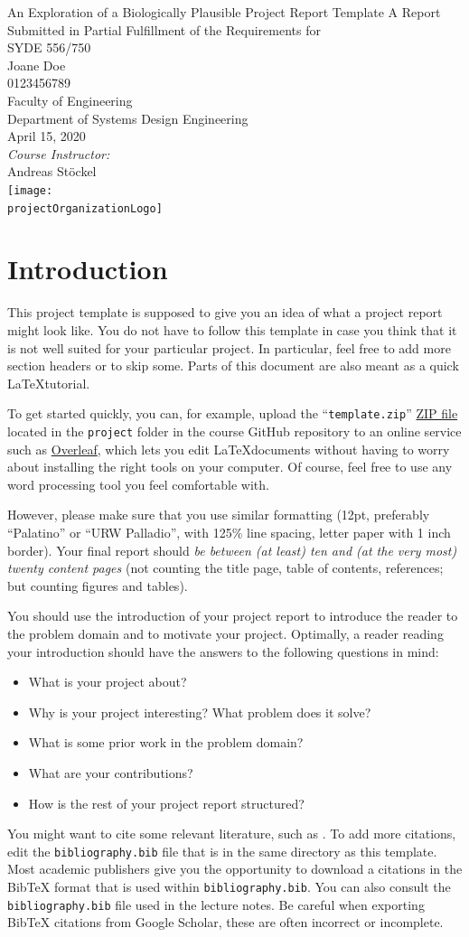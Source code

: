 \documentclass[12pt,letterpaper,oneside]{article}
\newcommand{\MakeTitle}{%
	{%
		\thispagestyle{empty}
		\centering
		{\huge \projectName}
		\vfill
		{\large A Report Submitted in Partial Fulfillment of the Requirements for\\ \projectCourse}\\[1cm]
		{\large \projectStudentName}\\
		{\projectStudentID} \\[1cm]
		{\large \projectStudentFaculty}\\
		{\large \projectStudentDepartment}\\
		\vfill
		{\large \projectDate}\\[1cm]
		\emph{Course Instructor:}\\
		\projectCourseInstructor\\
		\vfill
		\texttt{[image: \\projectOrganizationLogo]}
		\setcounter{page}{0}
		\newpage%
	}%
	{%
		\pagenumbering{roman}
		\setcounter{tocdepth}{2}
		\tableofcontents
		\newpage
		
		\setcounter{page}{0}
		\pagenumbering{arabic}
	}
}
\newcommand{\projectCourse}%
	{SYDE 556/750}
\newcommand{\projectCourseInstructor}%
	{Andreas Stöckel}
\newcommand{\projectOrganizationLogo}%
	{assets/uwlogo.pdf}
\newcommand{\projectName}%
	{An Exploration of a Biologically Plausible Project Report Template}
\newcommand{\projectStudentName}%
	{Joane Doe}
\newcommand{\projectStudentID}%
	{0123456789}
\newcommand{\projectStudentFaculty}%
	{Faculty of Engineering}
\newcommand{\projectStudentDepartment}%
	{Department of Systems Design Engineering}
\newcommand{\projectDate}%
	{April 15, 2020}
\begin{document}
	\MakeTitle

	\section{Introduction}
	\label{sec:introduction}

	This project template is supposed to give you an idea of what a project report might look like. You do not have to follow this template in case you think that it is not well suited for your particular project. In particular, feel free to add more section headers or to skip some. Parts of this document are also meant as a quick \LaTeX tutorial.

	To get started quickly, you can, for example, upload the \enquote{\texttt{template.zip}} \href{https://github.com/astoeckel/syde556-w20/raw/master/project/template.zip}{ZIP file} located in the \texttt{project} folder in the course GitHub repository to an online service such as \href{https://www.overleaf.com/}{Overleaf}, which lets you edit \LaTeX documents without having to worry about installing the right tools on your computer. Of course, feel free to use any word processing tool you feel comfortable with.

	However, please make sure that you use similar formatting (12pt, preferably \enquote{Palatino} or \enquote{URW Palladio}, with 125\% line spacing, letter paper with 1 inch border). Your final report should \emph{be between (at least) ten and (at the very most) twenty content pages} (not counting the title page, table of contents, references; but counting figures and tables).

	You should use the introduction of your project report to introduce the reader to the problem domain and to motivate your project. Optimally, a reader reading your introduction should have the answers to the following questions in mind:
	\begin{itemize}
		\item What is your project about?
		\item Why is your project interesting? What problem does it solve?
		\item What is some prior work in the problem domain?
		\item What are your contributions?
		\item How is the rest of your project report structured?
	\end{itemize}

 	You might want to cite some relevant literature, such as \cite{eliasmith2003neural,eliasmith2013how}. To add more citations, edit the \texttt{bibliography.bib} file that is in the same directory as this template. Most academic publishers give you the opportunity to download a citations in the BibTeX format that is used within \texttt{bibliography.bib}. You can also consult the \texttt{bibliography.bib} file used in the lecture notes. Be careful when exporting BibTeX citations from Google Scholar, these are often incorrect or incomplete.
 	
\end{document}

